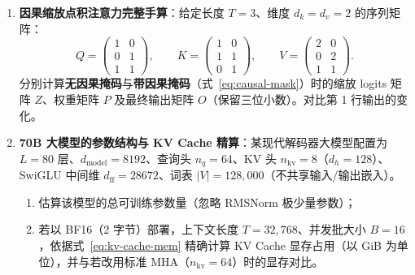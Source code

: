 \begin{enumerate}
  \item[\textbf{5.4.1}] \textbf{因果缩放点积注意力完整手算}：给定长度 $T=3$、维度 $d_k = d_v = 2$ 的序列矩阵：
  \[
    Q = \begin{pmatrix} 1 & 0 \\ 0 & 1 \\ 1 & 1 \end{pmatrix}, \qquad
    K = \begin{pmatrix} 1 & 0 \\ 1 & 1 \\ 0 & 1 \end{pmatrix}, \qquad
    V = \begin{pmatrix} 2 & 0 \\ 0 & 2 \\ 1 & 1 \end{pmatrix}.
  \]
  分别计算\textbf{无因果掩码}与\textbf{带因果掩码}（式~\eqref{eq:causal-mask}）时的缩放 logits 矩阵 $Z$、权重矩阵 $P$ 及最终输出矩阵 $O$（保留三位小数）。对比第 1 行输出的变化。

  \item[\textbf{5.4.2}] \textbf{70B 大模型的参数结构与 KV Cache 精算}：某现代解码器大模型配置为 $L = 80$ 层、$d_{\text{model}} = 8192$、查询头 $n_q = 64$、KV 头 $n_{\text{kv}} = 8$（$d_h = 128$）、SwiGLU 中间维 $d_{\text{ff}} = 28672$、词表 $|V| = 128{,}000$（不共享输入/输出嵌入）。
  \begin{enumerate}
    \item 估算该模型的总可训练参数量（忽略 RMSNorm 极少量参数）；
    \item 若以 BF16（2 字节）部署，上下文长度 $T = 32{,}768$、并发批大小 $B = 16$，依据式~\eqref{eq:kv-cache-mem} 精确计算 KV Cache 显存占用（以 GiB 为单位），并与若改用标准 MHA（$n_{\text{kv}} = 64$）时的显存对比。
  \end{enumerate}
\end{enumerate}


